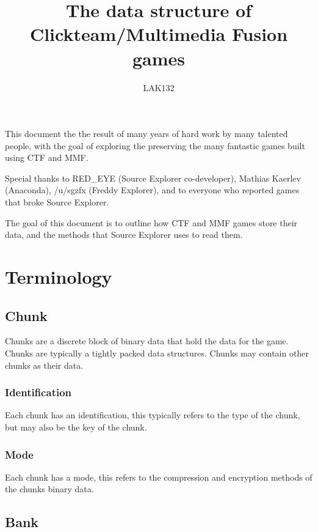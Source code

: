 \documentclass{article}
\title{The data structure of Clickteam/Multimedia Fusion games}
\author{LAK132}
\begin{document}
\maketitle

This document the the result of many years of hard work by many talented
people, with the goal of exploring the preserving the many fantastic games
built using CTF and MMF.

Special thanks to RED\_EYE (Source Explorer co-developer),
Mathias Kaerlev (Anaconda),
/u/sgzfx (Freddy Explorer),
and to everyone who reported games that broke Source Explorer.

The goal of this document is to outline how CTF and MMF games store their
data, and the methods that Source Explorer uses to read them.

\tableofcontents


\section{Terminology}

\subsection{Chunk}

Chunks are a discrete block of binary data that hold the data for the game.
Chunks are typically a tightly packed data structures.
Chunks may contain other chunks as their data.

\subsubsection{Identification}

Each chunk has an identification, this typically refers to the type of the
chunk, but may also be the key of the chunk.

\subsubsection{Mode}

Each chunk has a mode, this refers to the compression and encryption methods of
the chunks binary data.

\subsection{Bank}
\end{document}
